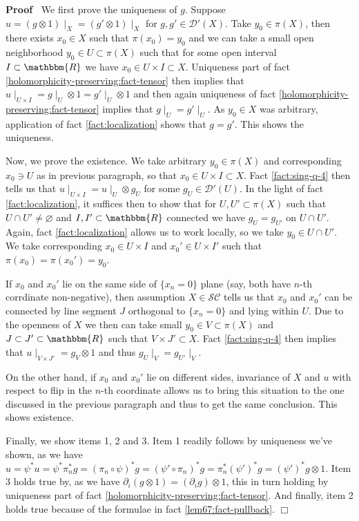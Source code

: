 \documentclass[12pt]{article}
\renewenvironment{proof}{\noindent\textbf{Proof\ }}{\hspace*{\fill}$\Box$\medskip}
\theoremstyle{remark}
\begin{document}
\begin{proof}
  We first prove the uniqueness of $g$. Suppose $u = (g \otimes 1) \mid_X
  = (g' \otimes 1) \mid_X$ for $g, g' \in \mathcal{D}' (X)$. Take $y_0 \in
  \pi (X)$, then there exists $x_0 \in X$ such that $\pi (x_0) = y_0$ and we
  can take a small open neighborhood $y_0 \in U \subset \pi (X)$ such that for
  some open interval $I \subset \mathbbm{R}$ we have $x_0 \in U \times I
  \subset X$. Uniqueness part of fact
  \ref{holomorphicity-preserving:fact-tensor} then implies that $u \mid_{U
  \times I} = g \mid_U \otimes 1 = g' \mid_U \otimes 1$ and then again
  uniqueness of fact \ref{holomorphicity-preserving:fact-tensor} implies that
  $g \mid_U = g' \mid_U$. As $y_0 \in X$ was arbitrary, application of
  fact \ref{fact:localization} shows that $g = g'$. This shows the uniqueness.
  
  Now, we prove the existence. We take arbitrary $y_0 \in \pi (X)$ and
  corresponding $x_0 \ni U$ as in previous paragraph, so that $x_0 \in U
  \times I \subset X$. Fact \ref{fact:sing-q-4} then tells us that $u
  \mid_{U \times I} = u \mid_U \otimes g_U$ for some $g_U \in
  \mathcal{D}' (U)$. In the light of fact \ref{fact:localization}, it suffices
  then to show that for $U, U' \subset \pi (X)$ such that $U \cap U' \neq
  \varnothing$ and $I, I' \subset \mathbbm{R}$ connected we have $g_U =
  g_{U'}$ on $U \cap U'$. Again, fact \ref{fact:localization} allows us to
  work locally, so we take $y_0 \in U \cap U'$. We take corresponding $x_0 \in
  U \times I$ and $x_0' \in U \times I'$ such that $\pi (x_0) = \pi (x_0') =
  y_0$.
  
  If $x_0$ and $x_0'$ lie on the same side of $\{ x_n = 0 \}$ plane (say, both
  have $n$-th corrdinate non-negative), then assumption $X \in
  \mathcal{S}\mathcal{C}$ tells us that $x_0$ and $x_0'$ can be connected by
  line segment $J$ orthogonal to $\{ x_n = 0 \}$ and lying within $U$. Due to
  the openness of $X$ we then can take small $y_0 \in V \subset \pi (X)$ and
  $J \subset J' \subset \mathbbm{R}$ such that $V \times J' \subset X$. Fact
  \ref{fact:sing-q-4} then implies that $u \mid_{V \times J'} = g_V
  \otimes 1$ and thus $g_U \mid_V = g_{U'} \mid_V$.
  
  On the other hand, if $x_0$ and $x_0'$ lie on different sides, invariance
  of $X$ and $u$ with respect to flip in the $n$-th coordinate allows us to
  bring this situation to the one discussed in the previous paragraph and thus
  to get the same conclusion. This shows existence.
  
  Finally, we show items 1, 2 and 3. Item 1 readily follows by uniqueness
  we've shown, as we have $u = \psi^{\ast} u = \psi^{\ast} \pi_n^{\ast} g =
  (\pi_n \circ \psi)^{\ast} g = (\psi' \circ \pi_n)^{\ast} g = \pi_n^{\ast}
  (\psi')^{\ast} g = (\psi')^{\ast} g \otimes 1$. Item 3 holds true by, as we
  have $\partial_i (g \otimes 1) = (\partial_i g) \otimes 1$, this in turn
  holding by uniqueness part of fact
  \ref{holomorphicity-preserving:fact-tensor}. And finally, item 2 holds true
  because of the formulae in fact \ref{lem67:fact-pullback}.
\end{proof}
\end{document}
